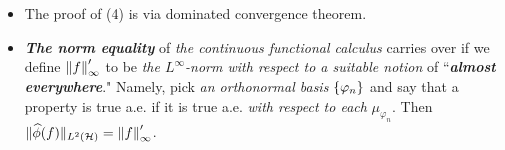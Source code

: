 \documentclass[11pt]{article}
\begin{document}
\begin{itemize}
\item \begin{remark}
The proof of (4) is via dominated convergence theorem.
\end{remark}

\item \begin{remark}
\emph{\textbf{The norm equality}} of \emph{the continuous functional calculus} carries over if we define $\left\|f\right\|_{\infty}'$ to be \emph{ the $L^{\infty}$-norm with respect to a suitable notion} of ``\emph{\textbf{almost everywhere}}."  Namely, pick \emph{an orthonormal basis} $\left\{\varphi_n\right\}$ and say that a property is true a.e. if it is true a.e. \emph{with respect to each} $\mu_{\varphi_n}$. Then $\|\widehat{\phi}(f)\|_{L^2({\mathcal H})} = \left\|f\right\|_{\infty}'$.
\end{remark}
\end{itemize}
\end{document}
